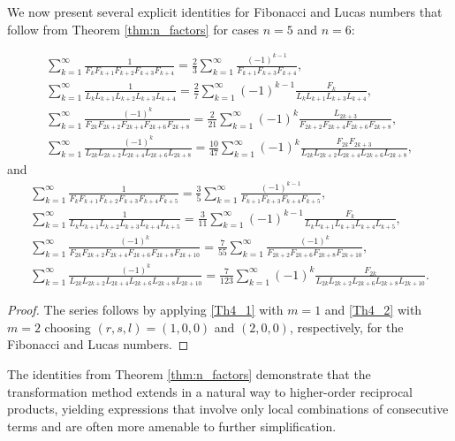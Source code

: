 \documentclass[12pt,reqno]{article}
\begin{document}
We now present several explicit identities for Fibonacci and Lucas numbers that follow from Theorem \ref{thm:n_factors} 
for cases $n=5$ and $n=6$: 
\begin{corollary}
	\begin{gather*}
		\sum_{k=1}^\infty \frac{1}{F_{k} F_{k+1} F_{k+2}F_{k+3}F_{k+4}} = \frac23\sum_{k=1}^\infty  \frac{(-1)^{k-1}}{F_{k+1} F_{k+3}F_{k+4}},\\
		\sum_{k=1}^\infty \frac{1}{L_{k} L_{k+1} L_{k+2}L_{k+3}L_{k+4}} = \frac27\sum_{k=1}^\infty (-1)^{k-1} \frac{F_k}{L_kL_{k+1} L_{k+3}L_{k+4}},\\
		\sum_{k=1}^\infty \frac{(-1)^k}{F_{2k} F_{2k+2}F_{2k+4}F_{2k+6}F_{2k+8}} = \frac2{21}\sum_{k=1}^\infty (-1)^{k} \frac{L_{2k+3}}{F_{2k+2} F_{2k+4}F_{2k+6}F_{2k+8}},\\
		\sum_{k=1}^\infty \frac{(-1)^k}{L_{2k} L_{2k+2}L_{2k+4}L_{2k+6}L_{2k+8}} 
		= \frac{10}{47}\sum_{k=1}^\infty  (-1)^{k} \frac{F_{2k}F_{2k+3}}{L_{2k}L_{2k+2} L_{2k+4}L_{2k+6}L_{2k+8}},
		\end{gather*}
	and
		\begin{gather*}
		\sum_{k=1}^\infty \frac{1}{F_{k} F_{k+1} F_{k+2}F_{k+3}F_{k+4}F_{k+5}} = \frac35\sum_{k=1}^\infty \frac{(-1)^{k-1}}{F_{k+1} F_{k+3}F_{k+4}F_{k+5}},\\
		\sum_{k=1}^\infty \frac{1}{L_{k} L_{k+1} L_{k+2}L_{k+3}L_{k+4}L_{k+5}} 
		= \frac3{11}\sum_{k=1}^\infty (-1)^{k-1} \frac{F_k}{L_kL_{k+1} L_{k+3}L_{k+4}L_{k+5}},\\
		\sum_{k=1}^\infty \frac{(-1)^k}{F_{2k} F_{2k+2}F_{2k+4}F_{2k+6}F_{2k+8}F_{2k+10}}
		= \frac7{55}\sum_{k=1}^\infty \frac{(-1)^{k}}{F_{2k+2} F_{2k+6}F_{2k+8}F_{2k+10}},\\
		\sum_{k=1}^\infty \frac{(-1)^k}{L_{2k} L_{2k+2}L_{2k+4}L_{2k+6}L_{2k+8} L_{2k+10}}
		= \frac{7}{123}\sum_{k=1}^\infty (-1)^{k} \frac{F_{2k}}{L_{2k}L_{2k+2} L_{2k+6}L_{2k+8}L_{2k+10}}.
		\end{gather*}
\end{corollary}
\begin{proof}
	The series follows by applying \eqref{Th4_1} with $m=1$ and \eqref{Th4_2} with $m=2$ choosing $(r,s,l)=(1,0,0)$ and $(2,0,0)$, respectively, for the Fibonacci and Lucas numbers.
\end{proof}

The identities from Theorem \ref{thm:n_factors} demonstrate that the transformation method extends in a natural way to higher-order reciprocal products, yielding expressions that involve only local combinations of consecutive terms and are often more amenable to further simplification.
\end{document}
